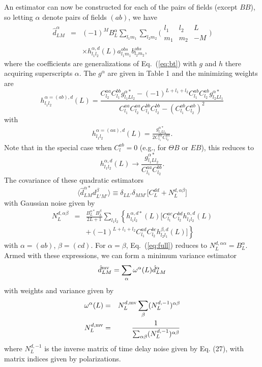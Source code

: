 \documentclass[prl,amsmath,amssymb,floatfix,superscriptaddress,nofootinbib,twocolumn]{revtex4-1}
\def\be{\begin{equation}}
\def\ee{\end{equation}}
\def\bea{\begin{eqnarray}}
\def\eea{\end{eqnarray}}
\newcommand{\ec}[1]{Eq.~(\ref{eq:#1})}
\newcommand{\eql}[1]{\label{eq:#1}}
\begin{document}
An estimator can now be constructed for each of the pairs of fields (except $BB$), so letting $\alpha$ denote pairs of fields $(ab)$, we have
\bea
\hat{d}^{\alpha}_{LM} &=&\nonumber  (-1)^{M} B_{L}^{\alpha}\sum_{l_{1}m_{1}}\sum_{l_{2}m_{2}}\bigl(\begin{smallmatrix} l_1 & l_2 & L \\ m_1 & m_2 & -M  \end{smallmatrix}\bigr) \\
&& \times h^{\alpha,d}_{l_{1}l_{2}}(L) a^{obs}_{l_{1}m_{1}}b^{obs}_{l_{2}m_{2}} ,
\eea
where the coefficients are generalizations of \ec{bt} with $g$ and $h$ there acquiring superscripts $\alpha$. The $g^\alpha$ are given in Table 1 and the minimizing weights are
\be
h^{\alpha=(ab),d}_{l_{1}l_{2}}(L) 
= \frac{C_{l_{2}}^{aa}C_{l_{1}}^{bb}g^{\alpha*}_{l_{1}Ll_{2}}-(-1)^{L+l_{1}+l_{2}}C_{l_{1}}^{ab}C_{l_{2}}^{ab}g^{\alpha*}_{l_{2}Ll_{1}}}{C_{l_{1}}^{aa}C_{l_{2}}^{aa}C_{l_{1}}^{bb}C_{l_{2}}^{bb}-(C_{l_{1}}^{ab}C_{l_{2}}^{ab})^{2}}
\ee
with 
\bea 
h_{l_{1}l_{2}}^{\alpha=(aa),d}(L)= \frac{g_{l_{1}Ll_{2}}^{\alpha*}}{2C_{l_{1}}^{aa}C_{l_{2}}^{aa}}.
\eea 
Note that in the special case when $C_{l}^{ab}=0$ (e.g., for $\Theta B$ or $EB$), this reduces to 
\be
h^{\alpha,d}_{l_{1}l_{2}}(L) \rightarrow \frac{g^{\alpha *}_{l_{1}Ll_{2}}}{C_{l_{1}}^{aa}C_{l_{2}}^{bb}}. 
\ee
The covariance of these quadratic estimators
\be
\langle \hat{d}^{\alpha*}_{LM}d^{\beta}_{L'M'}\rangle \equiv \delta_{LL'}\delta_{MM'}\big[ C_{L}^{dd}+N_{L}^{d,\alpha \beta} \big]
\ee
with Gaussian noise given by
\bea
N_{L}^{d,\alpha\beta}&=&\frac{B_{L}^{\alpha*}B_{L}^{\beta}}{2L+1}\sum_{l_{1}l_{2}}  \left\{ h_{l_{1}l_{2}}^{\alpha,d*} (L)\big[ C_{l_{1}}^{ac}C_{l_{2}}^{bd}h_{l_{1}l_{2}}^{\alpha,d}(L)\right. \nonumber \\
&&\left. +(-1)^{L+l_{1}+l_{2}}C_{l_{1}}^{ad}C_{l_{2}}^{bc} h_{l_{2}l_{1}}^{\beta,d}(L)  \big]\right\}\eql{full}
\eea
with $\alpha=(ab)$, $\beta=(cd)$. For $\alpha=\beta$, \ec{full} reduces to $N_{L}^{d,\alpha\alpha}=B_{L}^{\alpha}$.
Armed with these expressions, we can form a minimum variance estimator
\be
\hat{d}^{\rm mv}_{LM} = \sum_{\alpha}\omega^{\alpha}(L)\hat{d}^{\alpha}_{LM}
\ee
with weights and variance given by
\bea
\omega^{\alpha}(L) & =&N^{d,\rm mv}_{L} \sum_{\beta}(N_{L}^{d,-1})^{\alpha \beta} \\
N^{d,\rm mv}_{L} &=& \frac{1}{\sum_{\alpha\beta} (N_{L}^{d,-1})^{\alpha \beta}}
\eea
where $N_{L}^{d,-1}$ is the inverse matrix of time delay noise given by Eq. (27), with matrix indices given by polarizations. 
\end{document}
